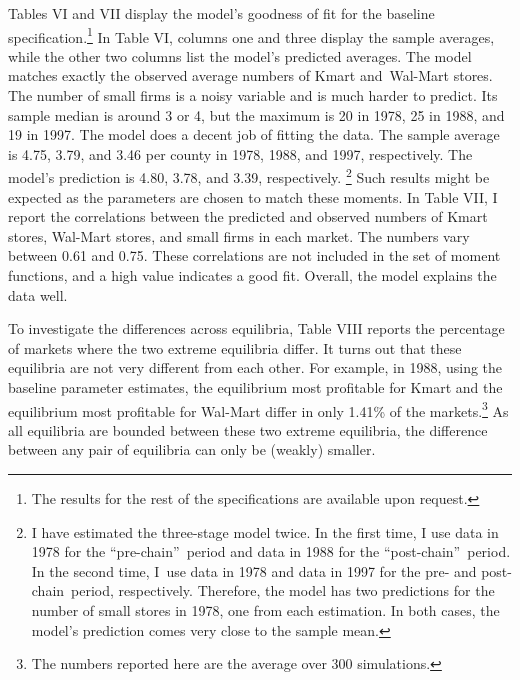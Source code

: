 \documentclass[notitlepage,onecolumn,11pt]{article}
\begin{document}
Tables VI and VII display the model's goodness of fit for the baseline
specification.\footnote{%
The results for the rest of the specifications are available upon request.}
In Table VI, columns one and three display the sample averages, while the
other two columns list the model's predicted averages. The model matches
exactly the observed average numbers of Kmart and\ Wal-Mart stores. The
number of small firms is a noisy variable and is much harder to predict. Its
sample median is around 3 or 4, but the maximum is 20 in 1978, 25 in 1988,
and 19 in 1997. The model does a decent job of fitting the data. The sample
average is 4.75, 3.79, and 3.46 per county in 1978, 1988, and 1997,
respectively. The model's prediction is 4.80, 3.78, and 3.39, respectively.%
\footnote{%
I have estimated the three-stage model twice. In the first time, I use data
in 1978 for the \textquotedblleft pre-chain\textquotedblright\ period and
data in 1988 for the \textquotedblleft post-chain\textquotedblright\ period.
In the second time, I\ use data in 1978 and data in 1997 for the pre- and
post-chain\ period, respectively. Therefore, the model has two predictions
for the number of small stores in 1978, one from each estimation. In both
cases, the model's prediction comes very close to the sample mean.} Such
results might be expected as the parameters are chosen to match these
moments. In Table VII, I report the correlations between the predicted and
observed numbers of Kmart stores, Wal-Mart stores, and small firms in each
market. The numbers vary between 0.61 and 0.75. These correlations are not
included in the set of moment functions, and a high value indicates a good
fit. Overall, the model explains the data well.

To investigate the differences across equilibria, Table VIII reports the
percentage of markets where the two extreme equilibria differ. It turns out
that these equilibria are not very different from each other. For example,
in 1988, using the baseline parameter estimates, the equilibrium most
profitable for Kmart and the equilibrium most profitable for Wal-Mart differ
in only 1.41\% of the markets.\footnote{%
The numbers reported here are the average over 300 simulations.} As all
equilibria are bounded between these two extreme equilibria, the difference
between any pair of equilibria can only be (weakly) smaller.
\end{document}
